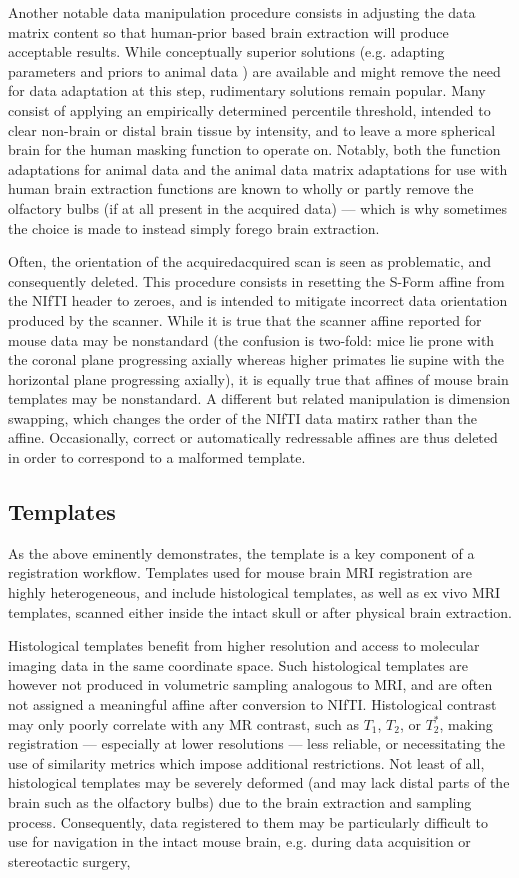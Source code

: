 Another notable data manipulation procedure consists in adjusting the data matrix content so that human-prior based brain extraction will produce acceptable results.
While conceptually superior solutions (e.g. adapting parameters and priors to animal data \cite{rbet,Oguz2014}) are available and might remove the need for data adaptation at this step, rudimentary solutions remain popular.
Many consist of applying an empirically determined percentile threshold, intended to clear non-brain or distal brain tissue by intensity, and to leave a more spherical brain for the human masking function to operate on.
Notably, both the function adaptations for animal data and the animal data matrix adaptations for use with human brain extraction functions are known to wholly or partly remove the olfactory bulbs (if at all present in the acquired data) --- which is why sometimes the choice is made to instead simply forego brain extraction.

Often, the orientation of the acquiredacquired scan is seen as problematic, and consequently deleted.
This procedure consists in resetting the S-Form affine from the NIfTI header to zeroes, and is intended to mitigate incorrect data orientation produced by the scanner.
While it is true that the scanner affine reported for mouse data may be nonstandard (the confusion is two-fold: mice lie prone with the coronal plane progressing axially whereas higher primates lie supine with the horizontal plane progressing axially), it is equally true that affines of mouse brain templates may be nonstandard.
A different but related manipulation is dimension swapping, which changes the order of the NIfTI data matirx rather than the affine.
Occasionally, correct or automatically redressable affines are thus deleted in order to correspond to a malformed template.

\subsection{Templates}
As the above eminently demonstrates, the template is a key component of a registration workflow.
Templates used for mouse brain MRI registration are highly heterogeneous, and include histological templates, as well as ex vivo MRI templates, scanned either inside the intact skull or after physical brain extraction.

Histological templates benefit from higher resolution and access to molecular imaging data in the same coordinate space.
Such histological templates are however not produced in volumetric sampling analogous to MRI, and are often not assigned a meaningful affine after conversion to NIfTI.
Histological contrast may only poorly correlate with any MR contrast, such as $T_1$, $T_2$, or $T_2^*$, making registration --- especially at lower resolutions --- less reliable, or necessitating the use of similarity metrics which impose additional restrictions.
Not least of all, histological templates may be severely deformed (and may lack distal parts of the brain such as the olfactory bulbs) due to the brain extraction and sampling process.
Consequently, data registered to them may be particularly difficult to use for navigation in the intact mouse brain, e.g. during data acquisition or stereotactic surgery,


